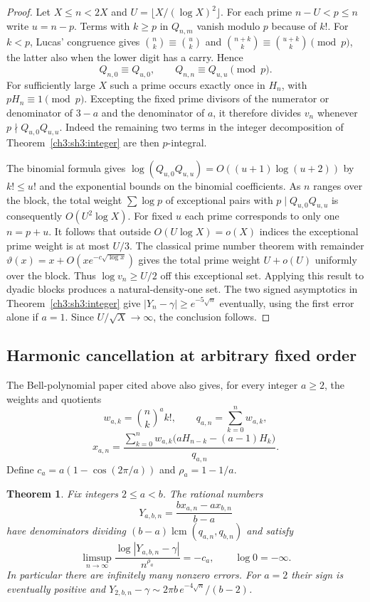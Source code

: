\documentclass[11pt,a4paper,oneside,openany]{report}
\newtheorem{theorem}{Theorem}[section]
\theoremstyle{remark}\newtheorem{remark}[theorem]{Remark}
\numberwithin{equation}{section}
\begin{document}
\begin{proof}
Let $X\le n<2X$ and $U=\lfloor X/(\log X)^2\rfloor$.
For each prime $n-U<p\le n$ write $u=n-p$. Terms with $k\ge p$
in $Q_{n,m}$ vanish modulo $p$ because of $k!$. For $k<p$, Lucas'
congruence gives $\binom nk\equiv\binom uk$ and
$\binom{n+k}{k}\equiv\binom{u+k}{k}\pmod p$, the latter also when
the lower digit has a carry. Hence
\[
 Q_{n,0}\equiv Q_{u,0},\qquad Q_{n,n}\equiv Q_{u,u}\pmod p .
\]
For sufficiently large $X$ such a prime occurs exactly once in
$H_n$, with $pH_n\equiv1\pmod p$. Excepting the fixed prime divisors
of the numerator or denominator of $3-a$ and the denominator of $a$,
it therefore divides $v_n$ whenever $p\nmid Q_{u,0}Q_{u,u}$.
Indeed the remaining two terms in the integer decomposition of
Theorem~\ref{ch3:sh3:integer} are then $p$-integral.

The binomial formula gives
$\log(Q_{u,0}Q_{u,u})=O((u+1)\log(u+2))$ by
$k!\le u!$ and the exponential bounds on the binomial coefficients.
As $n$ ranges over the block, the total weight $\sum\log p$ of
exceptional pairs with $p\mid Q_{u,0}Q_{u,u}$ is consequently
$O(U^2\log X)$. For fixed $u$ each prime corresponds to only one
$n=p+u$. It follows that outside $O(U\log X)=o(X)$ indices the
exceptional prime weight is at most $U/3$. The classical prime number
theorem with remainder
$\vartheta(x)=x+O(xe^{-c\sqrt{\log x}})$ gives the total prime
weight $U+o(U)$ uniformly over the block. Thus $\log v_n\ge U/2$
off this exceptional set. Applying this result to dyadic blocks
produces a natural-density-one set. The two signed asymptotics in
Theorem~\ref{ch3:sh3:integer} give $|Y_n-\gamma|\ge e^{-5\sqrt n}$
eventually, using the first error alone if $a=1$. Since
$U/\sqrt X\to\infty$, the conclusion follows.
\end{proof}

\subsection{Harmonic cancellation at arbitrary fixed order}

The Bell-polynomial paper cited above also gives, for every integer
$a\ge2$, the weights and quotients
\[
 w_{a,k}=\binom nk^a k!,\qquad q_{a,n}=\sum_{k=0}^n w_{a,k},
\]
\[
 x_{a,n}=\frac{\sum_{k=0}^n w_{a,k}
            \bigl(aH_{n-k}-(a-1)H_k\bigr)}{q_{a,n}}.
\]
Define $c_a=a(1-\cos(2\pi/a))$ and $\rho_a=1-1/a$.

\begin{theorem}\label{ch3:sh3:allorders}
Fix integers $2\le a<b$. The rational numbers
\[
 Y_{a,b,n}=\frac{b x_{a,n}-a x_{b,n}}{b-a}
\]
have denominators dividing
$(b-a)\operatorname{lcm}(q_{a,n},q_{b,n})$ and satisfy
\[
 \limsup_{n\to\infty}
   \frac{\log|Y_{a,b,n}-\gamma|}{n^{\rho_a}}=-c_a ,
 \qquad \log0=-\infty .
\]
In particular there are infinitely many nonzero errors. For $a=2$
their sign is eventually positive and
$Y_{2,b,n}-\gamma\sim 2\pi b\,e^{-4\sqrt n}/(b-2)$.
\end{theorem}
\end{document}
